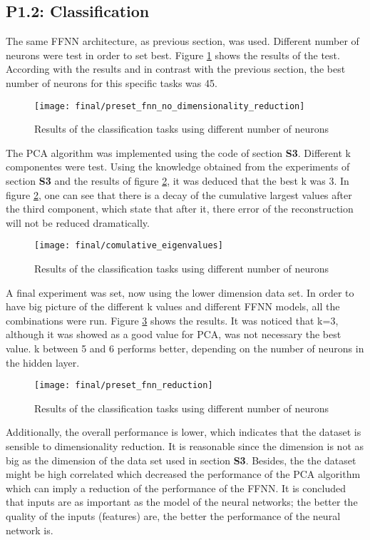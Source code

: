 \subsection{P1.2: Classification}
The same FFNN architecture, as previous section, was used. Different number of neurons were test in order to set best. Figure \ref{final_3__01} shows the results of the test. According with the results and in contrast with the previous section, the best number of neurons for this specific tasks was 45.
\bigbreak
\begin{figure}[!htbp]
\caption{Results of the classification tasks using different number of neurons}
\label{final_3__01}
\medbreak
\texttt{[image: final/preset\_fnn\_no\_dimensionality\_reduction]}
\centering
\end{figure}

The PCA algorithm was implemented using the code of section \textbf{S3}. Different k componentes were test. Using the knowledge obtained from the experiments of section \textbf{S3} and the results of figure \ref{final_3_2fff}, it was deduced that the best k was 3. In figure \ref{final_3_2fff}, one can see that there is a decay of the cumulative largest values after the third component, which state that after it, there error of the reconstruction will not be reduced dramatically.
\bigbreak
\begin{figure}[!htbp]
\caption{Results of the classification tasks using different number of neurons}
\label{final_3_2fff}
\medbreak
\texttt{[image: final/comulative\_eigenvalues]}
\centering
\end{figure}

A final experiment was set, now using the lower dimension data set. In order to have big picture of the different k values and different FFNN models, all the combinations were run. Figure \ref{final_3_3} shows the results. It was noticed that k=3, although it was showed as a good value for PCA, was not necessary the best value. k between 5 and 6 performs better, depending on the number of neurons in the hidden layer.
\bigbreak
\begin{figure}[!htbp]
\caption{Results of the classification tasks using different number of neurons}
\label{final_3_3}
\medbreak
\texttt{[image: final/preset\_fnn\_reduction]}
\centering
\end{figure}

Additionally, the overall performance is lower, which indicates that the dataset is sensible to dimensionality reduction. It is reasonable since the dimension is not as big as the dimension of the data set used in section \textbf{S3}. Besides, the the dataset might be high correlated which decreased the performance of the PCA algorithm which can imply a reduction of the performance of the FFNN. It is concluded that inputs are as important as the model of the neural networks; the better the quality of the inputs (features) are, the better the performance of the neural network is. 
\bigbreak

